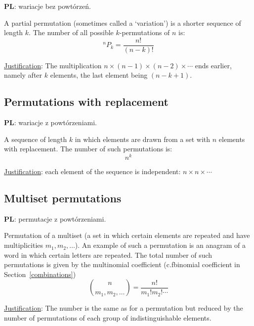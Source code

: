 \documentclass{article}
\makeatletter
\newcommand*{\cf}{c.f\@ifnextchar{.}{}{.\@\xspace}}
\newcommand{\pl}{\textbf{PL}: }
\makeatother
\begin{document}
\foreignlanguage{polish}{\pl wariacje bez powtórzeń.}

A partial permutation (sometimes called a `variation') is a shorter sequence of length $k$.
The number of all possible $k$\nobreakdash-\hspace{0pt}permutations of $n$ is:
%
\begin{equation}
    ^nP_k = \frac{n!}{(n-k)!}
\end{equation}

\underline{Justification}: The multiplication ${n\times(n-1)\times(n-2)\times \dotsb}$ ends earlier, namely after $k$ elements, the last element being $(n-k+1)$.


\subsection{Permutations with replacement}

\foreignlanguage{polish}{\pl wariacje z powtórzeniami.}

A sequence of length $k$ in which elements are drawn from a set with $n$ elements with replacement.
The number of such permutations is:
%
\begin{equation}
    n^k
\end{equation}

\underline{Justification}: each element of the sequence is independent: $n\times n\times \dotsb$

\subsection{Multiset permutations}
\label{mulper}

\foreignlanguage{polish}{\pl permutacje z powtórzeniami.}

Permutation of a multiset (a set in which certain elements are repeated and have multiplicities $m_1, m_2, \dotsc$).
An example of such a permutation is an anagram of a word in which certain letters are repeated.
The total number of such permutations is given by the multinomial coefficient (\cf binomial coefficient in Section~\ref{combinations})
%
\begin{equation}
    \binom{n}{m_1, m_2, \dotsc} = \frac{n!}{m_1!m_2!\dotsm}
\end{equation}

\underline{Justification}: The number is the same as for a permutation but reduced by the number of permutations of each group of indistinguishable elements.
\end{document}
